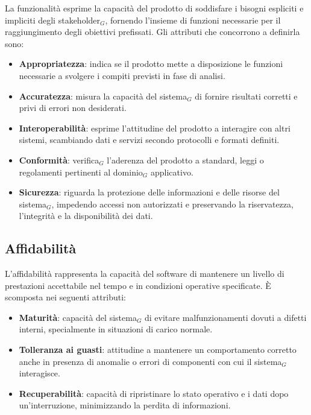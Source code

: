 \documentclass[a4paper, 10pt]{article}
\begin{document}
La funzionalità esprime la capacità del prodotto di soddisfare i bisogni espliciti e impliciti degli stakeholder$_G$, fornendo l'insieme di funzioni necessarie per il raggiungimento degli obiettivi prefissati. Gli attributi che concorrono a definirla sono:
\begin{itemize}
    \item \textbf{Appropriatezza}: indica se il prodotto mette a disposizione le funzioni necessarie a svolgere i compiti previsti in fase di analisi.
    \item \textbf{Accuratezza}: misura la capacità del sistema$_G$ di fornire risultati corretti e privi di errori non desiderati.
    \item \textbf{Interoperabilità}: esprime l'attitudine del prodotto a interagire con altri sistemi, scambiando dati e servizi secondo protocolli e formati definiti.
    \item \textbf{Conformità}: verifica$_G$ l'aderenza del prodotto a standard, leggi o regolamenti pertinenti al dominio$_G$ applicativo.
    \item \textbf{Sicurezza}: riguarda la protezione delle informazioni e delle risorse del sistema$_G$, impedendo accessi non autorizzati e preservando la riservatezza, l'integrità e la disponibilità dei dati.
\end{itemize}

\subsection{Affidabilità}
\label{subsec:affidabilita}

L'affidabilità rappresenta la capacità del software di mantenere un livello di prestazioni accettabile nel tempo e in condizioni operative specificate. È scomposta nei seguenti attributi:
\begin{itemize}
    \item \textbf{Maturità}: capacità del sistema$_G$ di evitare malfunzionamenti dovuti a difetti interni, specialmente in situazioni di carico normale.
    \item \textbf{Tolleranza ai guasti}: attitudine a mantenere un comportamento corretto anche in presenza di anomalie o errori di componenti con cui il sistema$_G$ interagisce.
    \item \textbf{Recuperabilità}: capacità di ripristinare lo stato operativo e i dati dopo un'interruzione, minimizzando la perdita di informazioni.
\end{itemize}
\end{document}
